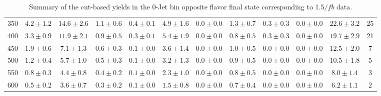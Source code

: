\begin{table}[!hb]
{\begin{center}
\begin{tabular}{l c c c c c c c c c c c }
350 & $4.2\pm1.2$ & $14.6\pm2.6$ & $1.1\pm0.6$ & $0.4\pm0.1$ & $4.9\pm1.6$ & $0.0\pm0.0$ & $1.3\pm0.7$ & $0.3\pm0.3$ & $0.0\pm0.0$ & $22.6\pm3.2$ & 25 \\
400 & $3.3\pm0.9$ & $11.9\pm2.1$ & $0.9\pm0.5$ & $0.3\pm0.1$ & $5.4\pm1.9$ & $0.0\pm0.0$ & $0.8\pm0.5$ & $0.3\pm0.3$ & $0.0\pm0.0$ & $19.7\pm2.9$ & 21 \\
450 & $1.9\pm0.6$ & $7.1\pm1.3$ & $0.6\pm0.3$ & $0.1\pm0.0$ & $3.6\pm1.4$ & $0.0\pm0.0$ & $1.0\pm0.5$ & $0.0\pm0.0$ & $0.0\pm0.0$ & $12.5\pm2.0$ & 7 \\
500 & $1.2\pm0.4$ & $5.7\pm1.0$ & $0.5\pm0.3$ & $0.1\pm0.0$ & $3.2\pm1.3$ & $0.0\pm0.0$ & $0.9\pm0.5$ & $0.0\pm0.0$ & $0.0\pm0.0$ & $10.5\pm1.8$ & 5 \\
550 & $0.8\pm0.3$ & $4.4\pm0.8$ & $0.4\pm0.2$ & $0.1\pm0.0$ & $2.3\pm1.0$ & $0.0\pm0.0$ & $0.8\pm0.5$ & $0.0\pm0.0$ & $0.0\pm0.0$ & $8.0\pm1.4$ & 3 \\
600 & $0.5\pm0.2$ & $3.6\pm0.7$ & $0.3\pm0.2$ & $0.1\pm0.0$ & $1.5\pm0.8$ & $0.0\pm0.0$ & $0.7\pm0.4$ & $0.0\pm0.0$ & $0.0\pm0.0$ & $6.2\pm1.1$ & 2 \\
\hline
\end{tabular}
\end{center}
}
\caption{Summary of the cut-based yields in the 0-Jet bin opposite flavor final state corresponding to 1.5$/fb$ data.}
\end{table}
